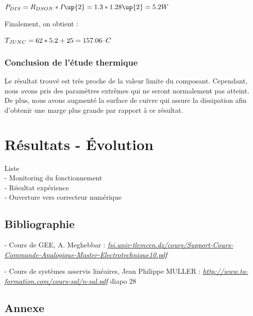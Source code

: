 \documentclass[11pt, french]{article} %
\begin{document}
\noindent
$
P_{DIS} = R_{DSON} * I\up{2} = 1.3 * 1.28\up{2} = 5.2 W
$

\vspace{0.5cm}

\noindent
Finalement, on obtient :

\vspace{0.5cm}

\noindent
$
T_{JUNC} = 62 * 5.2 + 25 = 157.06 \char123C
$

\subsubsection{Conclusion de l'étude thermique}

\noindent
Le résultat trouvé est très proche de la valeur limite du composant. Cependant, nous avons pris des paramètres extrêmes qui ne seront normalement pas atteint. De plus, nous avons augmenté la surface de cuivre qui assure la dissipation afin d'obtenir une marge plus grande par rapport à ce résultat. 

\section{Résultats - Évolution}
Liste
\\- Monitoring du fonctionnement
\\- Résultat expérience
\\- Ouverture vers correcteur numérique


\subsection{Bibliographie}

- Cours de GEE, A. Meghebbar :
\newline \textit{\underline{fsi.univ-tlemcen.dz/cours/Support-Cours-Commande-Analogique-Master-Electrotechnique10.pdf}} 

- Cours de systèmes asservis linéaires, Jean Philippe MULLER : 
\newline \textit{\underline{http://www.ta-formation.com/cours-sal/n-sal.pdf}} diapo 28

\subsection{Annexe}
\end{document}
